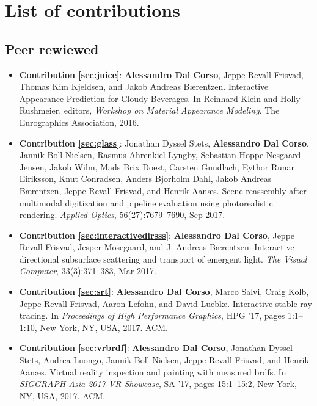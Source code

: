 \chapter*{List of contributions}
\label{sec:contributionlist}
\section*{Peer rewiewed}
\begin{itemize}
\item \textbf{Contribution \ref{sec:juice}}: \textbf{Alessandro Dal Corso}, Jeppe Revall Frisvad, Thomas Kim Kjeldsen, and Jakob Andreas Bærentzen. Interactive Appearance Prediction for Cloudy Beverages. In Reinhard Klein and Holly Rushmeier, editors, \textit{Workshop on Material Appearance Modeling}. The Eurographics Association, 2016.~\cite{dalcorsomam16}
\item \textbf{Contribution \ref{sec:glass}}: Jonathan Dyssel Stets, \textbf{Alessandro Dal Corso}, Jannik Boll Nielsen, Rasmus Ahrenkiel Lyngby, Sebastian Hoppe Nesgaard Jensen, Jakob Wilm, Mads Brix Doest, Carsten Gundlach, Eythor Runar Eiriksson, Knut Conradsen, Anders Bjorholm Dahl, Jakob Andreas Bærentzen, Jeppe Revall Frisvad, and Henrik Aanæs. Scene reassembly after multimodal digitization and pipeline evaluation using photorealistic rendering. \textit{Applied Optics}, 56(27):7679–7690, Sep 2017.~\cite{stets17}
\item \textbf{Contribution \ref{sec:interactivedirsss}}: \textbf{Alessandro Dal Corso}, Jeppe Revall Frisvad, Jesper Mosegaard, and J. Andreas Bærentzen. Interactive directional subsurface scattering and transport of emergent light. \textit{The Visual Computer}, 33(3):371–383, Mar 2017.~\cite{dalcorso17dirsss}
\item \textbf{Contribution \ref{sec:srt}}: \textbf{Alessandro Dal Corso}, Marco Salvi, Craig Kolb, Jeppe Revall Frisvad, Aaron Lefohn, and David Luebke. Interactive stable ray tracing. In \textit{Proceedings of High Performance Graphics}, HPG ’17, pages 1:1–1:10, New York, NY, USA, 2017. ACM. \cite{dalcorso17hpg}
\item \textbf{Contribution \ref{sec:vrbrdf}}: \textbf{Alessandro Dal Corso}, Jonathan Dyssel Stets, Andrea Luongo, Jannik Boll Nielsen, Jeppe Revall Frisvad, and Henrik Aanæs. Virtual reality inspection and painting with measured brdfs. In \textit{SIGGRAPH Asia 2017 VR Showcase}, SA ’17, pages 15:1–15:2, New York, NY, USA, 2017. ACM.~\cite{dalcorso17vr}
\end{itemize}

